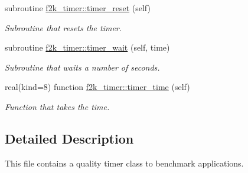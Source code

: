 \begin{DoxyCompactItemize}
subroutine \hyperlink{namespacef2k__timer_adfb594d0fe1e7b82a416e8b240653c9e}{f2k\+\_\+timer\+::timer\+\_\+reset} (self)
\begin{DoxyCompactList}\small\item\em Subroutine that resets the timer. \end{DoxyCompactList}\item 
subroutine \hyperlink{namespacef2k__timer_a247439a0545b74e9205436b1e39e122e}{f2k\+\_\+timer\+::timer\+\_\+wait} (self, time)
\begin{DoxyCompactList}\small\item\em Subroutine that waits a number of seconds. \end{DoxyCompactList}\item 
real(kind=8) function \hyperlink{namespacef2k__timer_ac3d2422b80e4fc9939d7bd816dc57c23}{f2k\+\_\+timer\+::timer\+\_\+time} (self)
\begin{DoxyCompactList}\small\item\em Function that takes the time. \end{DoxyCompactList}\end{DoxyCompactItemize}


\subsection{Detailed Description}
This file contains a quality timer class to benchmark applications. 

